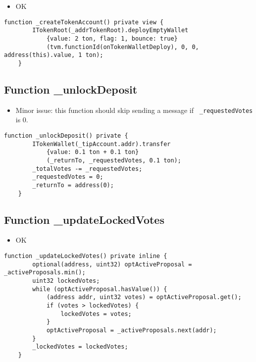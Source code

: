 \begin{itemize}
\item OK
\end{itemize}

\begin{lstlisting}[firstnumber=197]
    function _createTokenAccount() private view {
        ITokenRoot(_addrTokenRoot).deployEmptyWallet
            {value: 2 ton, flag: 1, bounce: true}
            (tvm.functionId(onTokenWalletDeploy), 0, 0, address(this).value, 1 ton);
    }
\end{lstlisting}

\subsection{Function \_{}unlockDeposit}

\begin{itemize}
\item Minor issue: this function should skip sending a message if {\tt
  \_requestedVotes} is 0.
\end{itemize}

\begin{lstlisting}[firstnumber=146]
    function _unlockDeposit() private {
        ITokenWallet(_tipAccount.addr).transfer
            {value: 0.1 ton + 0.1 ton}
            (_returnTo, _requestedVotes, 0.1 ton);
        _totalVotes -= _requestedVotes;
        _requestedVotes = 0;
        _returnTo = address(0);
    }
\end{lstlisting}

\subsection{Function \_{}updateLockedVotes}

\begin{itemize}
\item OK
\end{itemize}

\begin{lstlisting}[firstnumber=155]
    function _updateLockedVotes() private inline {
        optional(address, uint32) optActiveProposal = _activeProposals.min();
        uint32 lockedVotes;
        while (optActiveProposal.hasValue()) {
            (address addr, uint32 votes) = optActiveProposal.get();
            if (votes > lockedVotes) {
                lockedVotes = votes;
            }
            optActiveProposal = _activeProposals.next(addr);
        }
        _lockedVotes = lockedVotes;
    }
\end{lstlisting}
